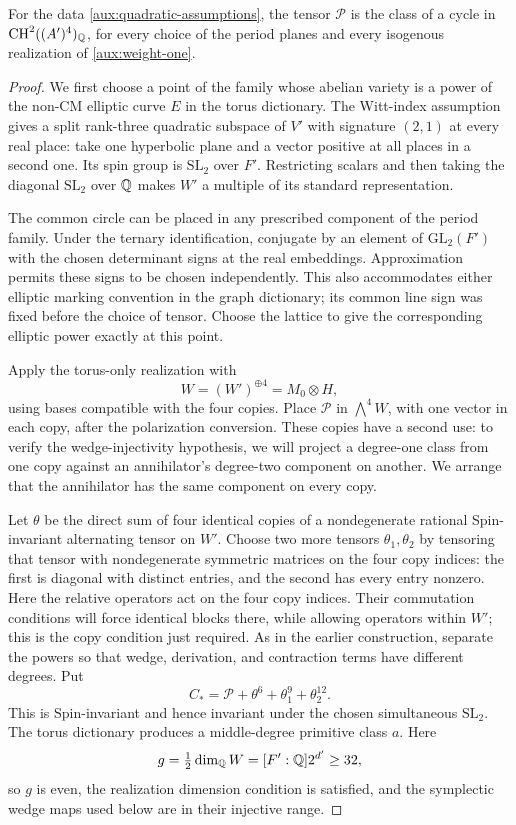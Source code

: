 \begin{proposition}
 \label{prop:auxiliary-spin}
For the data \eqref{aux:quadratic-assumptions}, the tensor
$\mathcal P$ is the class of a cycle in
$\operatorname{CH}^2((A')^4)_{\mathbb Q}$, for every choice of the period planes and
every isogenous realization of \eqref{aux:weight-one}.
\end{proposition}

\begin{proof}
We first choose a point of the family whose abelian
variety is a power of the non-CM elliptic curve $E$
in the torus dictionary.  The Witt-index assumption
gives a split rank-three quadratic subspace of $V'$
with signature $(2,1)$ at every real place: take one
hyperbolic plane and a vector positive at all places
in a second one.  Its spin group is $\mathrm{SL}_2$
over $F'$.  Restricting scalars and then taking the
diagonal $\mathrm{SL}_2$ over $\mathbb Q$ makes $W'$ a
multiple of its standard representation.

The common circle can be placed in any prescribed
component of the period family.  Under the ternary
identification, conjugate by an element of
$\mathrm{GL}_2(F')$ with the chosen determinant signs
at the real embeddings.  Approximation permits these
signs to be chosen independently.  This also accommodates
either elliptic marking convention in the graph
dictionary; its common line sign was fixed before the
choice of tensor.  Choose the lattice to give the
corresponding elliptic power exactly at this point.

Apply the torus-only realization with
\[
 W=(W')^{\oplus4}=M_0\otimes H,
\]
using bases compatible with the four copies.  Place
$\mathcal P$ in $\bigwedge^4W$, with one vector in
each copy, after the polarization conversion.  These copies
have a second use: to verify the wedge-injectivity hypothesis,
we will project a degree-one class from one copy against an
annihilator's degree-two component on another.  We arrange
that the annihilator has the same component on every copy.

Let
$\theta$ be the direct sum of four identical copies
of a nondegenerate rational Spin-invariant alternating
tensor on $W'$.  Choose two more tensors
$\theta_1,\theta_2$ by tensoring that tensor with
nondegenerate symmetric matrices on the four copy
indices: the first is diagonal with distinct entries,
and the second has every entry nonzero.  Here the relative
operators act on the four copy indices.  Their commutation
conditions will force identical blocks there, while allowing
operators within $W'$; this is the copy condition just required.
As in the earlier construction, separate the powers so that
wedge, derivation, and contraction terms have different degrees.
Put
\begin{equation}
 \label{aux:test-tensor}
 C_* =\mathcal P+\theta^6+\theta_1^9+\theta_2^{12}.
\end{equation}
This is Spin-invariant and hence invariant under the
chosen simultaneous $\mathrm{SL}_2$.  The torus
dictionary produces a middle-degree primitive class
$a$.  Here
\[
 g=\tfrac12\dim_{\mathbb Q}W=[F':\mathbb Q]2^{d'}\ge32,
\]
so $g$ is even, the realization dimension condition is
satisfied, and the symplectic wedge maps used below
are in their injective range.


\end{proof}
